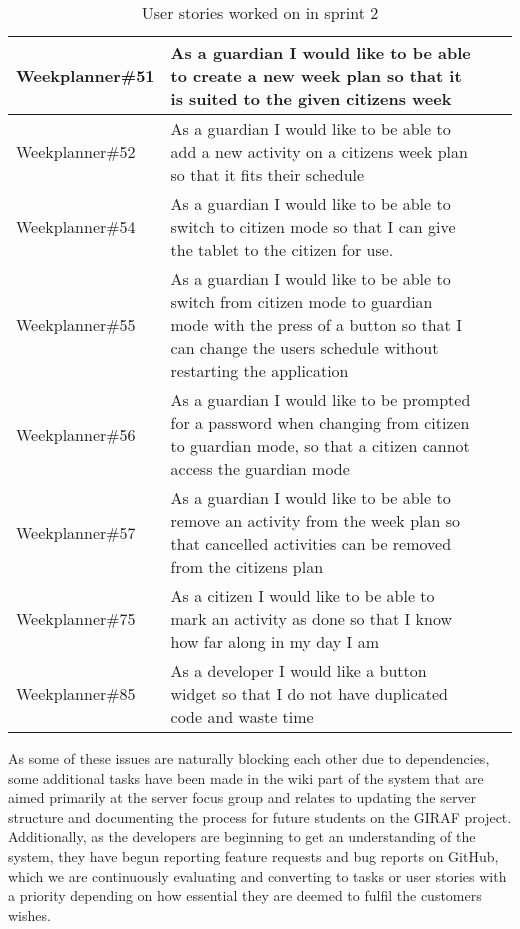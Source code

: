 \begin{table}[!ht]
\begin{tabular}{|p{2.8cm}|p{7cm}|p{1.5cm}|p{1.5cm}|}
    Weekplanner\#51 & As a guardian I would like to be able to create a new week plan so that it is suited to the given citizens week                                                                          &         &     \\ \hline
    Weekplanner\#52 & As a guardian I would like to be able to add a new activity on a citizens week plan so that it fits their schedule                                                                       &         &     \\ \hline
    Weekplanner\#54 & As a guardian I would like to be able to switch to citizen mode so that I can give the tablet to the citizen for use.                                                                    &         &     \\ \hline
    Weekplanner\#55 & As a guardian I would like to be able to switch from citizen mode to guardian mode with the press of a button so that I can change the users schedule without restarting the application &         &     \\ \hline
    Weekplanner\#56 & As a guardian I would like to be prompted for a password when changing from citizen to guardian mode, so that a citizen cannot access the guardian mode                                  &         &     \\ \hline
    Weekplanner\#57 & As a guardian I would like to be able to remove an activity from the week plan so that cancelled activities can be removed from the citizens plan                                        &         &     \\ \hline
    Weekplanner\#75 & As a citizen I would like to be able to mark an activity as done so that I know how far along in my day I am                                                                             &         &     \\ \hline
    Weekplanner\#85 & As a developer I would like a button widget so that I do not have duplicated code and waste time                                                                                         &         &     \\ \hline
    \end{tabular}
    \caption{User stories worked on in sprint 2}
\end{table}

\noindent As some of these issues are naturally blocking each other due to dependencies, some additional tasks have been made in the wiki part of the system that are aimed primarily at the server focus group and relates to updating the server structure and documenting the process for future students on the GIRAF project.
Additionally, as the developers are beginning to get an understanding of the system, they have begun reporting feature requests and bug reports on GitHub, which we are continuously evaluating and converting to tasks or user stories with a priority depending on how essential they are deemed to fulfil the customers wishes.
